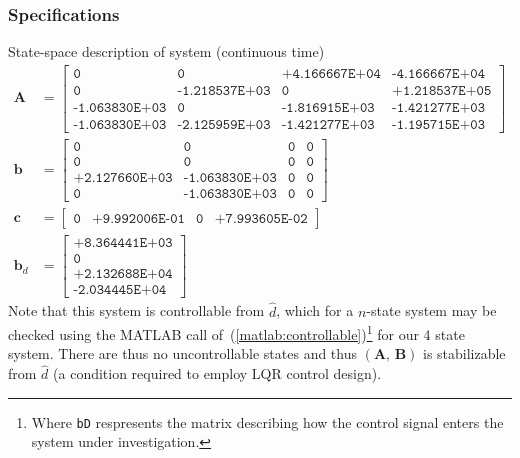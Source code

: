 \subsubsection{Specifications}\label{sec:simulation_specifications}
State-space description of system (continuous time)
\begin{align*}
\boldsymbol{A}
&=
\begin{bmatrix}
\texttt{0} & \texttt{0} & \texttt{+4.166667E+04} & \texttt{-4.166667E+04}\\
\texttt{0} & \texttt{-1.218537E+03} & \texttt{0} & \texttt{+1.218537E+05}\\
\texttt{-1.063830E+03} & \texttt{0} & \texttt{-1.816915E+03} & \texttt{-1.421277E+03}\\
\texttt{-1.063830E+03} & \texttt{-2.125959E+03} & \texttt{-1.421277E+03} & \texttt{-1.195715E+03}
\end{bmatrix}
\\[11pt]
\boldsymbol{b}
&=
\begin{bmatrix}
\texttt{0} & \texttt{0} & \texttt{0} & \texttt{0}\\
\texttt{0} & \texttt{0} & \texttt{0} & \texttt{0}\\
\texttt{+2.127660E+03} & \texttt{-1.063830E+03} & \texttt{0} & \texttt{0}\\
\texttt{0} & \texttt{-1.063830E+03} & \texttt{0} & \texttt{0}
\end{bmatrix}
\\[11pt]
\boldsymbol{c}
&=
\begin{bmatrix}
\texttt{0} & \texttt{+9.992006E-01} & \texttt{0} & \texttt{+7.993605E-02}
\end{bmatrix}
\\[11pt]
\boldsymbol{b}_d
&=
\begin{bmatrix}
\texttt{+8.364441E+03}\\
\texttt{0}\\
\texttt{+2.132688E+04}\\
\texttt{-2.034445E+04}
\end{bmatrix}
\end{align*}
Note that this system is controllable from $\hat{d}$, which for a $n$-state system may be checked using the \textsf{MATLAB} call of~(\ref{matlab:controllable})\footnote{Where \texttt{bD} respresents the matrix describing how the control signal enters the system under investigation.} for our 4 state system. There are thus no uncontrollable states and thus $(\boldsymbol{A}, \, \boldsymbol{B})$ is stabilizable from $\hat{d}$ (a condition required to employ LQR control design).
